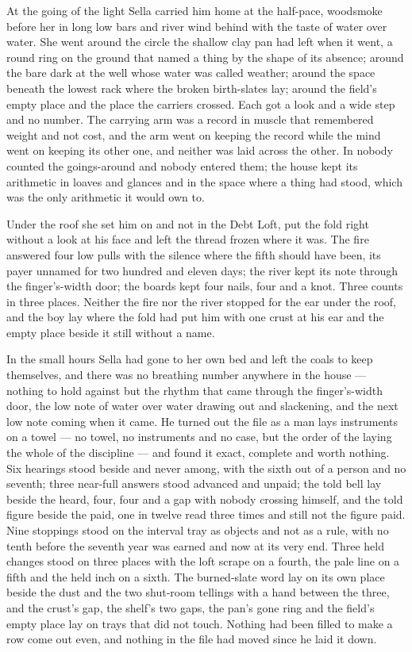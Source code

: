 \scenebreak

At the going of the light Sella carried him home at the half-pace, woodsmoke before her in long low bars and river wind behind with the taste of water over water. She went around the circle the shallow clay pan had left when it went, a round ring on the ground that named a thing by the shape of its absence; around the bare dark  at the well whose water was called weather; around the space beneath the lowest rack where the broken birth-slates lay; around the field's empty place and the place the carriers crossed. Each got a look and a wide step and no number. The carrying arm was a record in muscle that remembered weight and not cost, and the arm went on keeping the record while the mind went on keeping its other one, and neither was laid across the other. In  nobody counted the goings-around and nobody entered them; the house kept its arithmetic in loaves and glances and in the space where a thing had stood, which was the only arithmetic it would own to.

Under the roof she set him on  and not in the Debt Loft, put the fold right without a look at his face and left the thread frozen where it was. The fire answered four low pulls with the silence where the fifth should have been, its payer unnamed for two hundred and eleven days; the river kept its note through the finger's-width door; the boards kept four nails, four and a knot. Three counts in three places. Neither the fire nor the river stopped for the ear under the roof, and the boy lay where the fold had put him with one crust at his ear and the empty place beside it still without a name.

\scenebreak

In the small hours Sella had gone to her own bed and left the coals to keep themselves, and there was no breathing number anywhere in the house --- nothing to hold against but the rhythm that came through the finger's-width door, the low note of water over water drawing out and slackening, and the next low note coming when it came. He turned out the file as a man lays instruments on a towel --- no towel, no instruments and no case, but the order of the laying the whole of the discipline --- and found it exact, complete and worth nothing. Six hearings stood beside and never among, with the sixth out of a person and no seventh; three near-full answers stood advanced and unpaid; the told bell lay beside the heard, four, four and a gap with nobody crossing himself, and the told figure beside the paid, one in twelve read three times and still not the figure paid. Nine stoppings stood on the interval tray as objects and not as a rule, with no tenth before the seventh year was earned and now at its very end. Three held changes stood on three places with the loft scrape on a fourth, the pale line on a fifth and the held inch on a sixth. The burned-slate word lay on its own place beside the dust and the two shut-room tellings with a hand between the three, and the crust's gap, the shelf's two gaps, the pan's gone ring and the field's empty place lay on trays that did not touch. Nothing had been filled to make a row come out even, and nothing in the file had moved since he laid it down.

